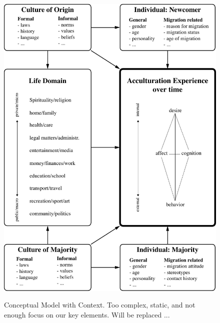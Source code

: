\documentclass[man, 12pt, a4paper]{apa7}
\begin{document}
\begin{figure}[h]
\centering
\caption{Conceptual Model with Context. Too complex, static, and not enough focus on our key elements. Will be replaced ...}
\includegraphics[width=\textwidth]{Figures/ConceptualFrameworkStatic.pdf}
\label{fig:ModelContext}
\end{figure}
\end{document}
